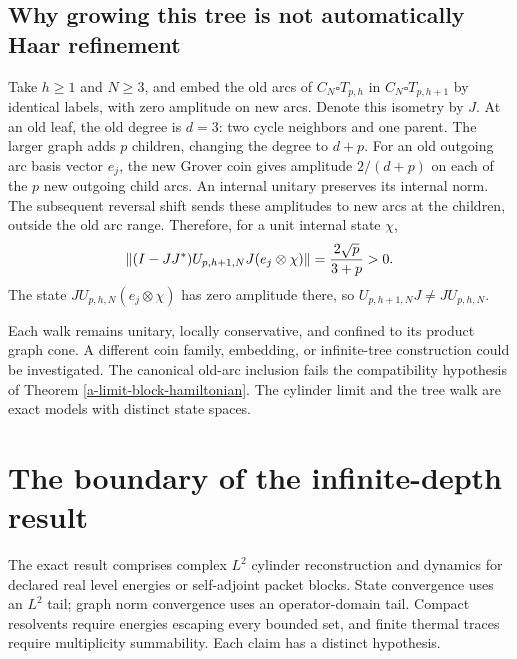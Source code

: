 \FloatBarrier
{}
\subsection{Why growing this tree is not automatically Haar refinement}

\begin{example}
\label{a-limit-walk-refinement-counterexample}
Take $h\geq1$ and $N\geq3$, and embed the old arcs of
$C_N\square T_{p,h}$ in $C_N\square T_{p,h+1}$ by identical labels,
with zero amplitude on new arcs. Denote this isometry by $J$.
At an old leaf, the old degree is $d=3$: two cycle neighbors and one
parent. The larger graph adds $p$ children, changing the degree to $d+p$.
For an old outgoing arc basis vector $e_j$, the new Grover coin gives
amplitude $2/(d+p)$ on each of the $p$ new outgoing child arcs. An
internal unitary preserves its internal norm. The subsequent reversal
shift sends these amplitudes to new arcs at the children, outside the old
arc range. Therefore, for a unit internal state $\chi$,
\begin{equation}
 \left\lVert(I-JJ^*)U_{p,h+1,N}J(e_j\otimes\chi)\right\rVert
 =\frac{2\sqrt p}{3+p}>0.
 \label{a-limit-walk-refinement-leakage}
\end{equation}
The state $JU_{p,h,N}(e_j\otimes\chi)$ has zero amplitude there, so
$U_{p,h+1,N}J\neq JU_{p,h,N}$.
\end{example}

Each walk remains unitary, locally conservative, and confined to its
product graph cone. A different coin family, embedding, or infinite-tree
construction could be investigated. The canonical old-arc inclusion
fails the compatibility hypothesis of
Theorem \ref{a-limit-block-hamiltonian}. The cylinder limit and the tree
walk are exact models with distinct state spaces.


\section{The boundary of the infinite-depth result}
\label{a-limit-scope}

The exact result comprises complex $L^2$ cylinder reconstruction and
dynamics for declared real level energies or self-adjoint packet blocks.
State convergence uses an $L^2$ tail; graph norm convergence uses an
operator-domain tail. Compact resolvents require energies escaping every
bounded set, and finite thermal traces require multiplicity summability.
Each claim has a distinct hypothesis.

